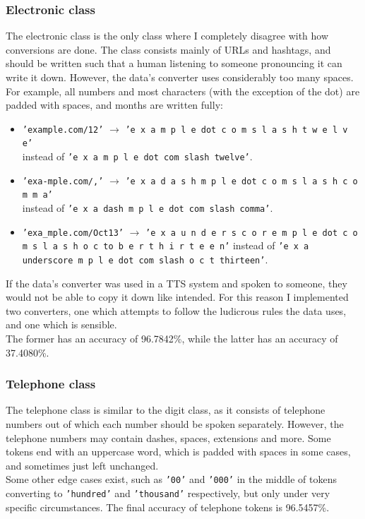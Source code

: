 \documentclass[a4paper, 9pt]{extarticle}
\newcommand{\str}[1]{\texttt{'#1'}}
\begin{document}
\subsubsection{Electronic class}
The electronic class is the only class where I completely disagree with how conversions are done. The class consists mainly of URLs and hashtags, and should be written such that a human listening to someone pronouncing it can write it down. However, the data's converter uses considerably too many spaces. For example, all numbers and most characters (with the exception of the dot) are padded with spaces, and months are written fully:
\begin{itemize}
    \itemsep-0.3em
    \item \str{example.com/12} $\to$ \str{e x a m p l e dot c o m s l a s h t w e l v e}\\ instead of \str{e x a m p l e dot com slash twelve}.
    \item \str{exa-mple.com/,} $\to$ \str{e x a d a s h m p l e dot c o m s l a s h c o m m a}\\ instead of \str{e x a dash m p l e dot com slash comma}.
    \item \str{exa\_mple.com/Oct13} $\to$ \str{e x a u n d e r s c o r e m p l e dot c o m s l a s h o c to b e r t h i r t e e n} instead of \str{e x a underscore m p l e dot com slash o c t thirteen}.
\end{itemize}
If the data's converter was used in a TTS system and spoken to someone, they would not be able to copy it down like intended. For this reason I implemented two converters, one which attempts to follow the ludicrous rules the data uses, and one which is sensible.\\
The former has an accuracy of 96.7842\%, while the latter has an accuracy of 37.4080\%.

\subsubsection{Telephone class}
The telephone class is similar to the digit class, as it consists of telephone numbers out of which each number should be spoken separately. However, the telephone numbers may contain dashes, spaces, extensions and more. Some tokens end with an uppercase word, which is padded with spaces in some cases, and sometimes just left unchanged.\\
Some other edge cases exist, such as \str{00} and \str{000} in the middle of tokens converting to \str{hundred} and \str{thousand} respectively, but only under very specific circumstances. 
The final accuracy of telephone tokens is 96.5457\%.
\end{document}
